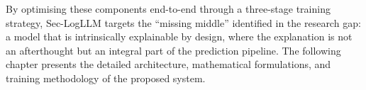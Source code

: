 By optimising these components end-to-end through a three-stage training strategy, Sec-LogLLM targets the ``missing middle'' identified in the research gap: a model that is intrinsically explainable by design, where the explanation is not an afterthought but an integral part of the prediction pipeline. The following chapter presents the detailed architecture, mathematical formulations, and training methodology of the proposed system.